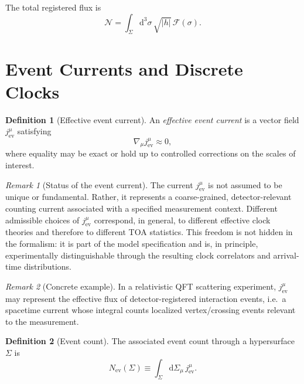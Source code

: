 \documentclass[11pt, a4paper]{article}
\theoremstyle{definition}
\newtheorem{definition}{Definition}[section]
\theoremstyle{plain}
\theoremstyle{remark}
\newtheorem{remark}{Remark}[section]
\numberwithin{equation}{section}
\newcommand{\dd}{\mathrm{d}}
\newcommand{\Sig}{\Sigma}
\newcommand{\Jev}{j^\mu_{\mathrm{ev}}}
\newcommand{\Nev}{N_{\mathrm{ev}}}
\newcommand{\F}{\mathcal{F}}
\begin{document}
    The total registered flux is
    \begin{equation}
        \mathcal{N} = \int_\Sig \dd^3\sigma\,\sqrt{|h|}\,\F(\sigma).
    \end{equation}

    \section{Event Currents and Discrete Clocks}\label{sec:eventcurrents}
    
    \begin{definition}[Effective event current]
An \emph{effective event current} is a vector field $\Jev$ satisfying
\begin{equation}
    \nabla_\mu \Jev \approx 0 ,
\end{equation}
where equality may be exact or hold up to controlled corrections on the scales of interest.
    \end{definition}
    
    \begin{remark}[Status of the event current]
The current $j^\mu_{\mathrm{ev}}$ is not assumed to be unique or fundamental. Rather, it represents a coarse-grained, detector-relevant counting current associated with a specified measurement context. Different admissible choices of $j^\mu_{\mathrm{ev}}$ correspond, in general, to different effective clock theories and therefore to different TOA statistics. This freedom is not hidden in the formalism: it is part of the model specification and is, in principle, experimentally distinguishable through the resulting clock correlators and arrival-time distributions.
    \end{remark}
    
    \begin{remark}[Concrete example]
In a relativistic QFT scattering experiment, $j^\mu_{\mathrm{ev}}$ may represent the effective flux of detector-registered interaction events, i.e.\ a spacetime current whose integral counts localized vertex/crossing events relevant to the measurement.
    \end{remark}
    
    \begin{definition}[Event count]
The associated event count through a hypersurface $\Sig$ is
\begin{equation}
    \Nev(\Sig) \equiv \int_\Sig \dd\Sigma_\mu\,\Jev .
\end{equation}
    \end{definition}
    
\end{document}
